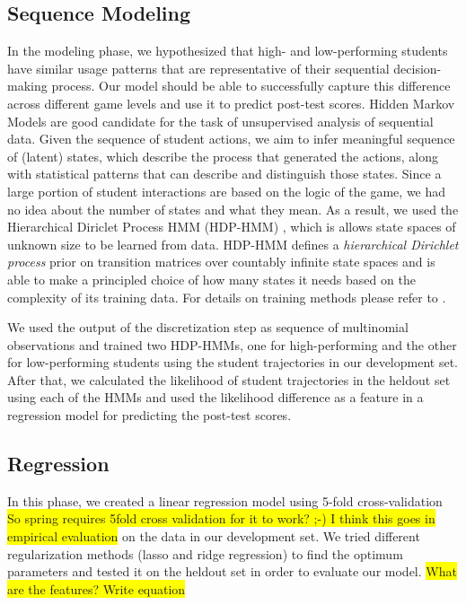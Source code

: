 \documentclass{sigchi}
\newcommand{\hl}[1]{\colorbox{yellow}{#1}}
\begin{document}
\subsection{Sequence Modeling}
In the modeling phase, we hypothesized that high- and low-performing students have similar usage patterns that are representative of their sequential decision-making process. 
Our model should be able to successfully capture this difference across different game levels and use it to predict post-test scores.
Hidden Markov Models are good candidate for the task of unsupervised analysis of sequential data.
Given the sequence of student actions, we aim to infer meaningful sequence of (latent) states, which describe the process that generated the actions, along with statistical patterns that can describe and distinguish those states.
Since a large portion of student interactions are based on the logic of the game, we had no idea about the number of states and what they mean.
As a result, we used the Hierarchical Diriclet Process HMM (HDP-HMM) \cite{fox2008hdp}, which is allows state spaces of unknown size to be learned from data. 
HDP-HMM defines a \textit{hierarchical Dirichlet process} prior on transition matrices over countably infinite state spaces and is able to make a principled choice of how many states it needs based on the complexity of its training data. 
For details on training methods please refer to \cite{fox2008hdp}.

We used the output of the discretization step as sequence of multinomial observations and trained two HDP-HMMs, one for high-performing and the other for low-performing students using the student trajectories in our development set. After that, we calculated the likelihood of student trajectories in the heldout set using each of the HMMs and used the likelihood difference as a feature in a regression model for predicting the post-test scores.

\subsection{Regression}

	In this phase, we created a linear regression model using 5-fold cross-validation \hl{So spring requires 5fold cross validation for it to work? ;-) I think this goes in empirical evaluation} on the data in our development set. We tried different regularization methods (lasso and ridge regression) to find the optimum parameters and tested it on the heldout set in order to evaluate our model. 
	\hl{What are the features? Write equation}
\end{document}
